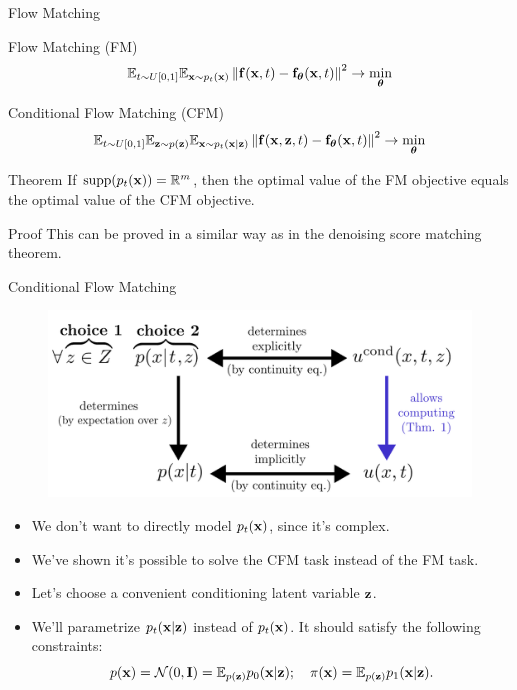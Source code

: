 \documentclass{beamer}
\begin{document}
\begin{frame}{Flow Matching}
	\begin{block}{Flow Matching (FM)}
		\vspace{-0.3cm}
		\[
			\mathbb{E}_{t \sim U[0, 1]} \mathbb{E}_{\mathbf{x} \sim p_t(\mathbf{x})}\left\| \mathbf{f}(\mathbf{x}, t) - \mathbf{f}_{\boldsymbol{\theta}}(\mathbf{x}, t) \right\|^2 \rightarrow \min_{\boldsymbol{\theta}}
		\]
		\vspace{-0.3cm}
	\end{block}
	\begin{block}{Conditional Flow Matching (CFM)}
		\vspace{-0.3cm}
		\[
			\mathbb{E}_{t \sim U[0, 1]} \mathbb{E}_{\mathbf{z} \sim p(\mathbf{z})} \mathbb{E}_{\mathbf{x} \sim p_t(\mathbf{x} | \mathbf{z})}\left\| \mathbf{f}(\mathbf{x}, \mathbf{z}, t) - \mathbf{f}_{\boldsymbol{\theta}}(\mathbf{x}, t) \right\|^2 \rightarrow \min_{\boldsymbol{\theta}}
		\]
		\vspace{-0.3cm}
	\end{block}
    \eqpause
	\begin{block}{Theorem}
		If $\text{supp}(p_t(\mathbf{x})) = \mathbb{R}^m$, then the optimal value of the FM objective equals the optimal value of the CFM objective.
	\end{block}
    \eqpause
	\begin{block}{Proof}
		This can be proved in a similar way as in the denoising score matching theorem.
	\end{block}
\end{frame}
\begin{frame}{Conditional Flow Matching}
	\begin{figure}
		\centering
		\includegraphics[width=0.75\linewidth]{figs/cfm_uncond_to_cond}
	\end{figure}
    \eqpause
	\begin{itemize}
		\item We don't want to directly model $p_t(\mathbf{x})$, since it's complex.
		\item We've shown it's possible to solve the CFM task instead of the FM task.
		\item Let's choose a convenient conditioning latent variable $\mathbf{z}$.
		\item We'll parametrize $p_t(\mathbf{x} | \mathbf{z})$ instead of $p_t(\mathbf{x})$. It should satisfy the following constraints:
		\[
			p(\mathbf{x}) = \mathcal{N}(0, \mathbf{I}) = \mathbb{E}_{p(\mathbf{z})} p_0(\mathbf{x} | \mathbf{z}); \quad \pi(\mathbf{x}) = \mathbb{E}_{p(\mathbf{z})} p_1(\mathbf{x} | \mathbf{z}).
		\]
	\end{itemize}
\end{frame}
\end{document}
